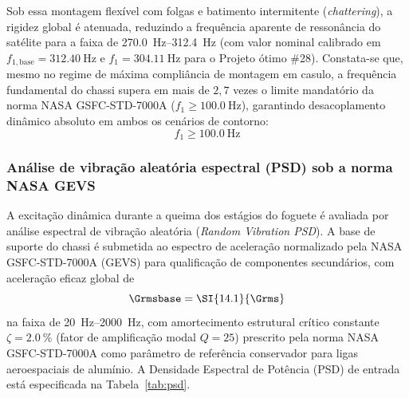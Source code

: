 Sob essa montagem flexível com folgas e batimento intermitente (\textit{chattering}), a rigidez global é atenuada, reduzindo a frequência aparente de ressonância do satélite para a faixa de \SIrange{270.0}{312.4}{\hertz} (com valor nominal calibrado em $f_{1,\text{base}} = \SI{312.40}{\hertz}$ e $f_1 = \SI{304.11}{\hertz}$ para o Projeto ótimo \#28). Constata-se que, mesmo no regime de máxima compliância de montagem em casulo, a frequência fundamental do chassi supera em mais de $2{,}7$ vezes o limite mandatório da norma NASA GSFC-STD-7000A ($f_1 \ge \SI{100.0}{\hertz}$), garantindo desacoplamento dinâmico absoluto em ambos os cenários de contorno:
\begin{equation}
  f_1 \ge \SI{100.0}{\hertz}
  \label{eq:f1min}
\end{equation}

\subsubsection{Análise de vibração aleatória espectral (PSD) sob a norma NASA GEVS}
\label{subsubsec:psd}

A excitação dinâmica durante a queima dos estágios do foguete é avaliada por análise espectral de vibração aleatória (\textit{Random Vibration PSD}). A base de suporte do chassi é submetida ao espectro de aceleração normalizado pela NASA GSFC-STD-7000A (GEVS) para qualificação de componentes secundários, com aceleração eficaz global de
\begin{equation}
  \Grmsbase = \SI{14.1}{\Grms}
  \label{eq:grmsbase}
\end{equation}
na faixa de \SIrange{20}{2000}{\hertz}, com amortecimento estrutural crítico constante $\zeta = \SI{2.0}{\percent}$ (fator de amplificação modal $Q = 25$) prescrito pela norma NASA GSFC-STD-7000A como parâmetro de referência conservador para ligas aeroespaciais de alumínio. A Densidade Espectral de Potência (PSD) de entrada está especificada na Tabela~\ref{tab:psd}.

